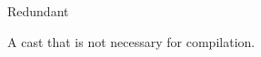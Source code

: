 \begin{pattern}{Redundant}
    
A cast that is not necessary for compilation.

\instances
    
\end{pattern}